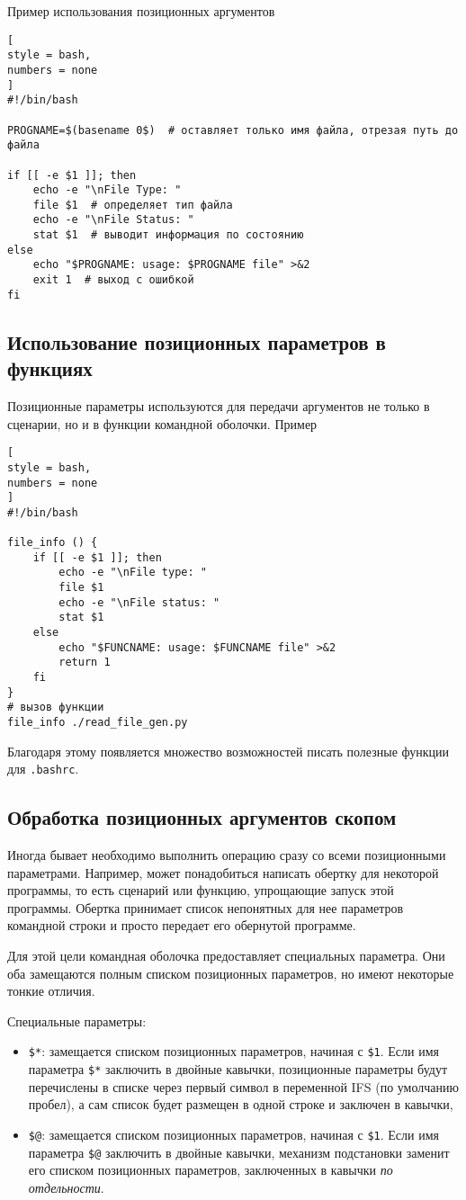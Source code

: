 \documentclass[%
	11pt,
	a4paper,
	utf8,
		]{article}
\begin{document}
Пример использования позиционных аргументов
\begin{lstlisting}[
style = bash,
numbers = none
]
#!/bin/bash

PROGNAME=$(basename 0$)  # оставляет только имя файла, отрезая путь до файла

if [[ -e $1 ]]; then
    echo -e "\nFile Type: "
    file $1  # определяет тип файла
    echo -e "\nFile Status: "
    stat $1  # выводит информация по состоянию
else
    echo "$PROGNAME: usage: $PROGNAME file" >&2
    exit 1  # выход с ошибкой
fi
\end{lstlisting}

\subsection{Использование позиционных параметров в функциях}

Позиционные параметры используются для передачи аргументов не только в сценарии, но и в функции командной оболочки. Пример
\begin{lstlisting}[
style = bash,
numbers = none
]
#!/bin/bash

file_info () {
    if [[ -e $1 ]]; then
        echo -e "\nFile type: "
        file $1
        echo -e "\nFile status: "
        stat $1
    else
        echo "$FUNCNAME: usage: $FUNCNAME file" >&2
        return 1
    fi
}
# вызов функции
file_info ./read_file_gen.py
\end{lstlisting}

Благодаря этому появляется множество возможностей писать полезные функции для \verb|.bashrc|.

\subsection{Обработка позиционных аргументов скопом}

Иногда бывает необходимо выполнить операцию сразу со всеми позиционными параметрами. Например, может понадобиться написать обертку для некоторой программы, то есть сценарий или функцию, упрощающие запуск этой программы. Обертка принимает список непонятных для нее параметров командной строки и просто передает его обернутой программе.

Для этой цели командная оболочка предоставляет специальных параметра. Они оба замещаются полным списком позиционных параметров, но имеют некоторые тонкие отличия.

Специальные параметры:
\begin{itemize}
	\item \verb|$*|: замещается списком позиционных параметров, начиная с \verb|$1|. Если имя параметра \verb|$*| заключить в двойные кавычки, позиционные параметры будут перечислены в списке через первый символ в переменной IFS (по умолчанию пробел), а сам список будет размещен в одной строке и заключен в кавычки,
	
	\item \verb|$@|: замещается списком позиционных параметров, начиная с \verb|$1|. Если имя параметра \verb|$@| заключить в двойные кавычки, механизм подстановки заменит его списком позиционных параметров, заключенных в кавычки \emph{по отдельности}.
\end{itemize}
\end{document}
